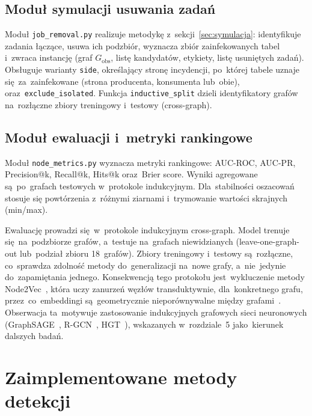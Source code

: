 \subsection{Moduł symulacji usuwania zadań}

Moduł \texttt{job\_removal.py} realizuje metodykę z~sekcji~\ref{sec:symulacja}:
identyfikuje zadania łączące, usuwa ich podzbiór, wyznacza zbiór zainfekowanych
tabel i~zwraca instancję (graf $G_{\mathrm{obs}}$, listę kandydatów,
etykiety, listę usuniętych zadań). Obsługuje warianty \texttt{side},
określający stronę incydencji, po~której tabele uznaje się~za~zainfekowane
(strona producenta, konsumenta lub~obie), oraz~\texttt{exclude\_isolated}. Funkcja \texttt{inductive\_split} dzieli
identyfikatory grafów na~rozłączne zbiory treningowy i~testowy (cross-graph).

\subsection{Moduł ewaluacji i~metryki rankingowe}

Moduł \texttt{node\_metrics.py} wyznacza metryki rankingowe: AUC-ROC,
AUC-PR, Precision@k, Recall@k, Hits@k oraz~Brier score. Wyniki agregowane
są~po~grafach testowych w~protokole indukcyjnym. Dla~stabilności oszacowań
stosuje się powtórzenia z~różnymi ziarnami i~trymowanie wartości skrajnych
(min/max).

Ewaluację prowadzi się~w~protokole indukcyjnym cross-graph.
Model trenuje się~na~podzbiorze grafów, a~testuje na~grafach niewidzianych
(leave-one-graph-out lub~podział zbioru 18~grafów). Zbiory treningowy
i~testowy są~rozłączne, co~sprawdza zdolność metody do~generalizacji
na~nowe grafy, a~nie~jedynie do~zapamiętania jednego. Konsekwencją tego
protokołu jest~wykluczenie metody Node2Vec~\cite{Grover2016}, która uczy zanurzeń
węzłów transduktywnie, dla~konkretnego grafu, przez~co~embeddingi
są~geometrycznie nieporównywalne między grafami~\cite{Hamilton2017}.
Obserwacja ta~motywuje zastosowanie indukcyjnych
grafowych sieci neuronowych (GraphSAGE~\cite{Hamilton2017},
R-GCN~\cite{Schlichtkrull2018}, HGT~\cite{Hu2020}), wskazanych w~rozdziale~5 jako~kierunek dalszych badań.

\section{Zaimplementowane metody detekcji}
\label{sec:algorytmy}


